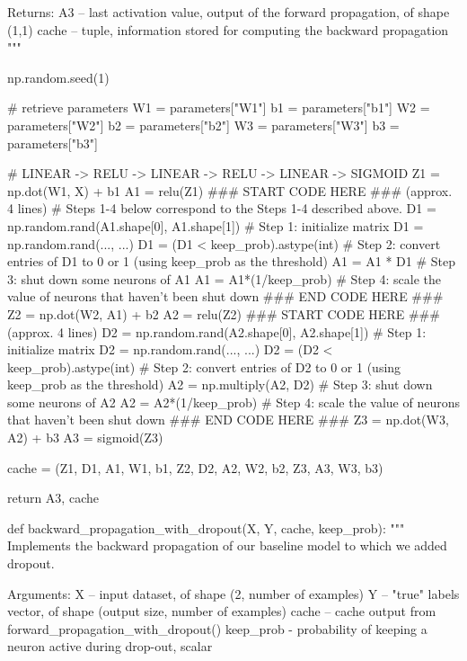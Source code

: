 \documentclass[11pt, onecolumn]{article}
\begin{document}
    Returns:
    A3 -- last activation value, output of the forward propagation, of shape (1,1)
    cache -- tuple, information stored for computing the backward propagation
    """
    
    np.random.seed(1)
    
    # retrieve parameters
    W1 = parameters["W1"]
    b1 = parameters["b1"]
    W2 = parameters["W2"]
    b2 = parameters["b2"]
    W3 = parameters["W3"]
    b3 = parameters["b3"]
    
    # LINEAR -> RELU -> LINEAR -> RELU -> LINEAR -> SIGMOID
    Z1 = np.dot(W1, X) + b1
    A1 = relu(Z1)
    ### START CODE HERE ### (approx. 4 lines)       # Steps 1-4 below correspond to the Steps 1-4 described above. 
    D1 = np.random.rand(A1.shape[0], A1.shape[1])   # Step 1: initialize matrix D1 = np.random.rand(..., ...)
    D1 = (D1 < keep_prob).astype(int)                                         # Step 2: convert entries of D1 to 0 or 1 (using keep_prob as the threshold)
    A1 = A1 * D1                                    # Step 3: shut down some neurons of A1
    A1 = A1*(1/keep_prob)                                 # Step 4: scale the value of neurons that haven't been shut down
    ### END CODE HERE ###
    Z2 = np.dot(W2, A1) + b2
    A2 = relu(Z2)
    ### START CODE HERE ### (approx. 4 lines)
    D2 = np.random.rand(A2.shape[0], A2.shape[1])   # Step 1: initialize matrix D2 = np.random.rand(..., ...)
    D2 = (D2 < keep_prob).astype(int)               # Step 2: convert entries of D2 to 0 or 1 (using keep_prob as the threshold)
    A2 = np.multiply(A2, D2)                        # Step 3: shut down some neurons of A2
    A2 = A2*(1/keep_prob)                                 # Step 4: scale the value of neurons that haven't been shut down
    ### END CODE HERE ###
    Z3 = np.dot(W3, A2) + b3
    A3 = sigmoid(Z3)
    
    cache = (Z1, D1, A1, W1, b1, Z2, D2, A2, W2, b2, Z3, A3, W3, b3)
    
    return A3, cache


def backward_propagation_with_dropout(X, Y, cache, keep_prob):
    """
    Implements the backward propagation of our baseline model to which we added dropout.
    
    Arguments:
    X -- input dataset, of shape (2, number of examples)
    Y -- "true" labels vector, of shape (output size, number of examples)
    cache -- cache output from forward_propagation_with_dropout()
    keep_prob - probability of keeping a neuron active during drop-out, scalar
    
\end{document}
